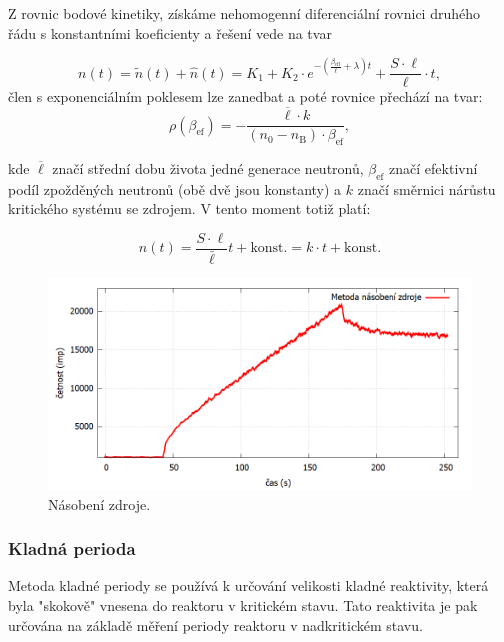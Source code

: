 Z rovnic bodové kinetiky, získáme nehomogenní
diferenciální rovnici druhého řádu s konstantními koeficienty a řešení vede na tvar

\begin{equation*}
n(t) = \tilde{n}(t) + \hat{n}(t) = K_1 + K_2 \cdot e^{-\left(\frac{\beta_{\text{eff}}}{\ell} + \lambda\right)t} + \frac{S \cdot \ell}{\ell} \cdot t,
\end{equation*}
člen s exponenciálním poklesem lze zanedbat a poté rovnice přechází na tvar:
\begin{equation} \label{eq:NZ}
    \boxed{ \rho (\beta_\text{ef}) = -\frac{\overline{\ell}\cdot k}{(n_\text{0} - n_\text{B}) \cdot \beta_\text{ef}}, }
\end{equation}

kde $\overline{\ell}$ značí střední dobu života jedné generace neutronů, $\beta_\text{ef}$  značí efektivní podíl zpožděných neutronů (obě dvě jsou konstanty) a $k$ značí směrnici nárůstu kritického systému se zdrojem. V tento moment totiž platí:

\begin{equation*}
 n(t) = \frac{S \cdot \ell}{\bar{\ell}} t + \text{konst.} = k\cdot t + \text{konst.}
\end{equation*}

\begin{figure}[H]
    \centering
    \includegraphics[scale=0.4]{img/NásobeníZdroje.png}
    \caption{Násobení zdroje.}
    \label{fig:NásobeníZdroje}
\end{figure}

\subsubsection{Kladná perioda}

Metoda kladné periody se používá k určování velikosti kladné reaktivity, která byla "skokově" vnesena do reaktoru v kritickém stavu. Tato reaktivita je pak určována na základě měření periody reaktoru v nadkritickém stavu.

